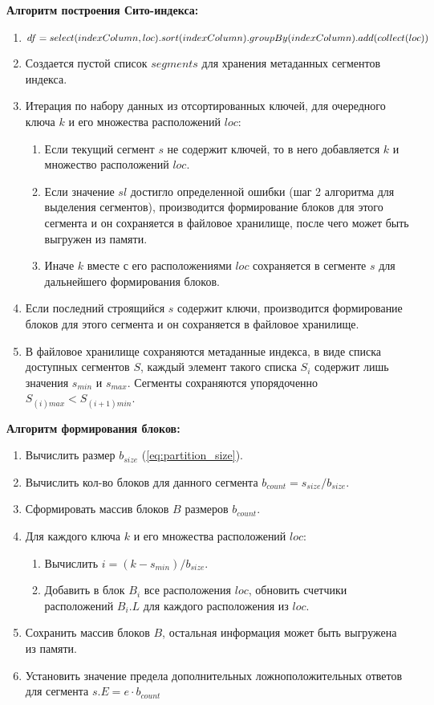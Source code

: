 \textbf{Алгоритм построения Сито-индекса:}
\begin{enumerate}
\item $df = select(indexColumn, loc).sort(indexColumn)\\.groupBy(indexColumn).add(collect(loc))$
\item Создается пустой список $segments$ для хранения метаданных сегментов индекса.
\item Итерация по набору данных из отсортированных ключей, для очередного ключа $k$ и его множества расположений $loc$:
    \begin{enumerate}
    \item Если текущий сегмент $s$ не содержит ключей, то в него добавляется $k$ и множество расположений $loc$.
    \item Если значение $sl$ достигло определенной ошибки (шаг 2 алгоритма для выделения сегментов), производится формирование блоков для этого сегмента и он сохраняется в файловое хранилище, после чего может быть выгружен из памяти.
    \item Иначе $k$ вместе с его расположениями $loc$ сохраняется в сегменте $s$ для дальнейшего формирования блоков.
    \end{enumerate}
\item Если последний строящийся $s$ содержит ключи, производится формирование блоков для этого сегмента и он сохраняется в файловое хранилище.
\item В файловое хранилище сохраняются метаданные индекса, в виде списка доступных сегментов $S$, каждый элемент такого списка $S_i$ содержит лишь значения $s_{min}$ и $s_{max}$. Сегменты сохраняются упорядоченно $S_{(i)max} < S_{(i+1)min}$.
\end{enumerate}

\textbf{Алгоритм формирования блоков:}
\begin{enumerate}
    \item Вычислить размер $b_{size}$ (\ref{eq:partition_size}).
    \item Вычислить кол-во блоков для данного сегмента $b_{count} = s_{size} / b_{size}$.
    \item Сформировать массив блоков $B$ размеров $b_{count}$.
    \item Для каждого ключа $k$ и его множества расположений $loc$: 
        \begin{enumerate}
        \item Вычислить $i = (k - s_{min}) / b_{size}$.
        \item Добавить в блок $B_{i}$ все расположения $loc$, обновить счетчики расположений $B_{i}.L$ для каждого расположения из $loc$.
        \end{enumerate}
    \item Сохранить массив блоков $B$, остальная информация может быть выгружена из памяти.
    \item Установить значение предела дополнительных ложноположительных ответов для сегмента $s.E = e \cdot b_{count}$
\end{enumerate}

